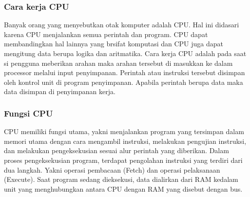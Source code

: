  			\subsubsection{Cara kerja CPU}
 		Banyak orang yang menyebutkan otak komputer adalah CPU. Hal ini didasari karena CPU menjalankan semua perintah dan program. CPU dapat membandingkan hal lainnya yang brsifat komputasi dan CPU juga dapat mengitung data berupa logika dan aritmatika. Cara kerja CPU adalah pada saat si pengguna meberikan arahan maka arahan tersebut di masukkan ke dalam processor melalui input penyimpanan. Perintah atau instruksi tersebut disimpan oleh kontrol unit di program penyimpanan. Apabila perintah berupa data maka data disimpan di penyimpanan kerja. 



 			\subsubsection{Fungsi CPU}
 		CPU memiliki fungsi utama, yakni menjalankan program yang tersimpan dalam memori utama dengan cara mengambil instruksi, melakukan pengujian  instruksi, dan melakukan pengeksekusian sesuai alur perintah yang diberikan. Dalam proses pengeksekusian program, terdapat pengolahan instruksi yang terdiri dari dua langkah. Yakni operasi pembacaan (Fetch) dan operasi pelaksanaan (Execute). Saat program sedang dieksekusi, data dialirkan dari RAM kedalam unit yang menghubungkan antara CPU dengan RAM yang disebut dengan bus.